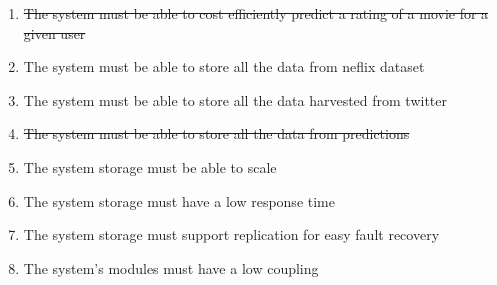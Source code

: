 \begin{enumerate}[label=\bfseries NFR \arabic*:]
  \item {\color{RedOrange}\st{The system must be able to cost efficiently predict a rating of a movie for a given user}}
  \item {\color{OliveGreen}The system must be able to store all the data from neflix dataset}
  \item {\color{OliveGreen}The system must be able to store all the data harvested from twitter}
  \item {\color{RedOrange}\st{The system must be able to store all the data from predictions}}
  \item {\color{OliveGreen}The system storage must be able to scale}
  \item {\color{OliveGreen}The system storage must have a low response time}
  \item {\color{OliveGreen}The system storage must support replication for easy fault recovery}
  \item {\color{OliveGreen}The system's modules must have a low coupling}
\end{enumerate}

